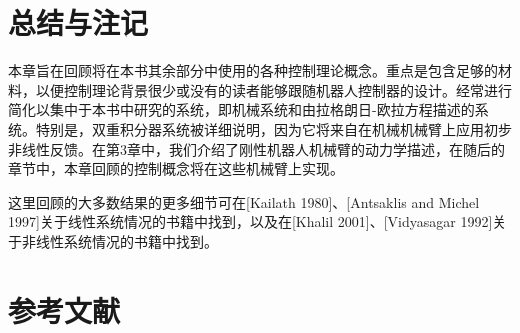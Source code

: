 \documentclass[UTF8,12pt,a4paper]{ctexart}
\theoremstyle{definition}
\begin{document}
\section{总结与注记}

本章旨在回顾将在本书其余部分中使用的各种控制理论概念。重点是包含足够的材料，以便控制理论背景很少或没有的读者能够跟随机器人控制器的设计。经常进行简化以集中于本书中研究的系统，即机械系统和由拉格朗日-欧拉方程描述的系统。特别是，双重积分器系统被详细说明，因为它将来自在机械机械臂上应用初步非线性反馈。在第3章中，我们介绍了刚性机器人机械臂的动力学描述，在随后的章节中，本章回顾的控制概念将在这些机械臂上实现。

这里回顾的大多数结果的更多细节可在[Kailath 1980]、[Antsaklis and Michel 1997]关于线性系统情况的书籍中找到，以及在[Khalil 2001]、[Vidyasagar 1992]关于非线性系统情况的书籍中找到。

\section*{参考文献}
\end{document}
